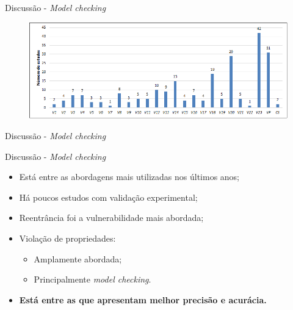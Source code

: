 \begin{frame}{Discussão - \textit{Model checking}}
    \begin{figure}[!htb]
		\centering
		\includegraphics[scale=0.55]{figuras/metodologia/rq3-vulnerabilidades.png}
	\end{figure}
\end{frame}

\begin{frame}{Discussão - \textit{Model checking}}
	 
\end{frame}   

\begin{frame}{Discussão - \textit{Model checking}}
	\begin{itemize}
		\item Está entre as abordagens mais utilizadas nos últimos anos;
		\item Há poucos estudos com validação experimental;
		\item Reentrância foi a vulnerabilidade mais abordada;
		\item Violação de propriedades:
		\begin{itemize}
			\item Amplamente abordada;
			\item Principalmente \textit{model checking}.
		\end{itemize}
		\item \textbf{Está entre as que apresentam melhor precisão e acurácia.}
	\end{itemize}
\end{frame}


